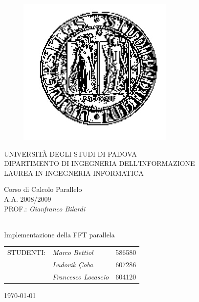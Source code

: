 \begin{titlepage}

		\thispagestyle{empty}
    \begin{figure}
    \centering
    \includegraphics[scale=0.45]{immagini/tesi_logounipd2}
    \end{figure}
    
    \vskip 1.5cm{
    \begin{center}\sc
        UNIVERSIT\`A DEGLI STUDI DI PADOVA\\
        DIPARTIMENTO DI INGEGNERIA DELL'INFORMAZIONE\\
        LAUREA IN INGEGNERIA INFORMATICA\end{center}
		}
		
		\vskip1.2cm\begin{center}
    	\rm\large\expandafter{Corso di Calcolo Parallelo\\}
      \rm\large\uppercase\expandafter{A.A. 2008/2009\\}
      \rm\large\uppercase\expandafter{Prof.:}
    	\emph{Gianfranco Bilardi}\end{center}
    	
    \vskip1.6cm\begin{center}
    \HRule \\[0.4cm]\LARGE\expandafter{Implementazione della FFT parallela}
    \HRule \\[0.4cm]
    \end{center}
    
    \begin{flushright}\vskip2.0cm 
    \begin{tabular}{rll}
	   \rm\large \uppercase{Studenti:}
	   &\emph{Marco Bettiol} &586580\\
	   & \emph{Ludovik \c{C}oba} &607286\\
	   & \emph{Francesco Locascio} &604120\\
		\end{tabular}
		\end{flushright}
    \vfill\begin{center}\today \end{center}
    
\end{titlepage}

\newpage

